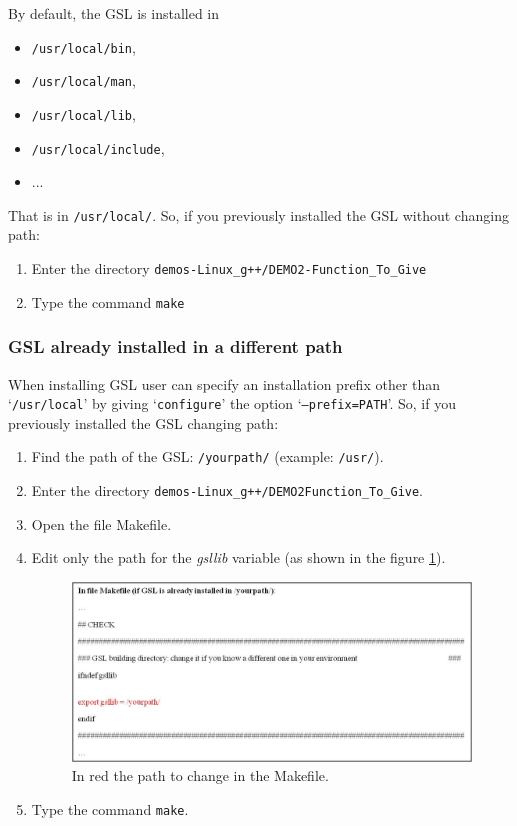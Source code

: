\documentclass[10pt]{article}
\begin{document}
By default, the GSL is installed in
\begin{itemize}
 \item {\tt /usr/local/bin},
 \item {\tt /usr/local/man},
 \item {\tt /usr/local/lib},
 \item {\tt /usr/local/include},
 \item ...
\end{itemize}
That is in {\tt /usr/local/}. So, if you previously installed the GSL without changing path:
\begin{enumerate}
 \item Enter the directory {\tt demos-Linux\_g++/DEMO2-Function\_To\_Give}
 \item Type the command {\tt make}
\end{enumerate}


\subsubsection{GSL already installed in a different path}

When installing GSL user can specify an installation prefix other than `{\tt /usr/local}' by giving `{\tt configure}' the
option `{\tt --prefix=PATH}'. So, if you previously installed the GSL changing path:
\begin{enumerate}
 \item Find the path of the GSL: {\tt /yourpath/} (example: {\tt /usr/}).
\item Enter the directory {\tt demos-Linux\_g++/DEMO2\textendash Function\_To\_Give}.
\item Open the file Makefile.
\item Edit only the path for the \emph{gsllib} variable (as shown in the figure \ref{fig:gsl2}).

\begin{figure}[!h]
\begin{center}
\includegraphics[scale=0.6]{Immagine12}
\caption{\label{fig:gsl2}In red the path to change in the Makefile.}
\end{center}
\end{figure}

\item Type the command {\tt make}.
\end{enumerate}
\end{document}
